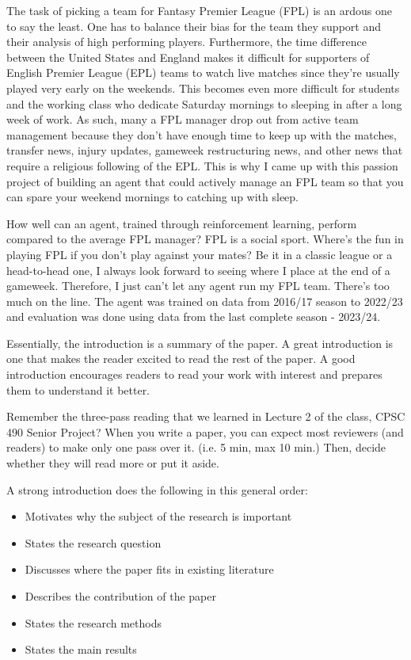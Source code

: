 The task of picking a team for Fantasy Premier League (FPL) is an ardous one to say the least. One has to balance their bias for 
the team they support and their analysis of high performing players. Furthermore, the time difference between the United States and England makes 
it difficult for supporters of English Premier League (EPL) teams to watch live matches since they're usually played very early on the weekends. This becomes 
even more difficult for students and the working class who dedicate Saturday mornings to sleeping in after a long week of work. As such, many a FPL manager 
drop out from active team management because they don't have enough time to keep up with the matches, transfer news, injury updates, gameweek restructuring news, and 
other news that require a religious following of the EPL. This is why I came up with this passion project of building an agent that could actively manage an FPL team so that 
you can spare your weekend mornings to catching up with sleep.

How well can an agent, trained through reinforcement learning, perform compared to the average FPL manager? FPL is a social sport. Where's the fun in playing FPL if you don't play against your mates? 
Be it in a classic league or a head-to-head one, I always look forward to seeing where I place at the end of a gameweek. Therefore, I just can't let any agent run my FPL team. There's too much on the line. 
The agent was trained on data from 2016/17 season to 2022/23 and evaluation was done using data from the last complete season - 2023/24.




Essentially, the introduction is a summary of the paper. A great introduction is one that makes the reader excited to read the rest of the paper. A good introduction encourages readers to read your work with interest and prepares them to understand it better. 

Remember the three-pass reading that we learned in Lecture 2 of the class, CPSC 490 Senior Project? 
When you write a paper, you can expect most reviewers (and readers) to make only one pass over it. (i.e. 5 min, max 10 min.) Then, decide whether they will read more or put it aside. 


A strong introduction does the following in this general order:
\begin{itemize}
    \item Motivates why the subject of the research is important
    \item States the research question
    \item Discusses where the paper fits in existing literature
    \item Describes the contribution of the paper
    \item States the research methods
    \item States the main results
\end{itemize}


